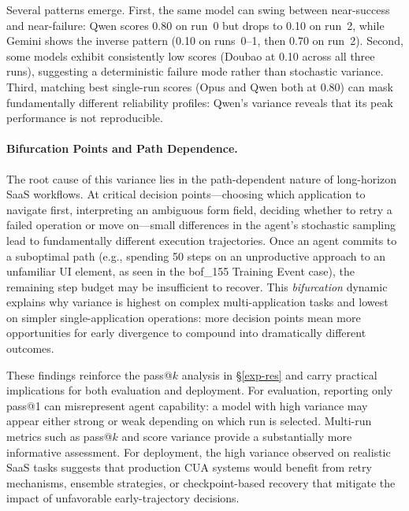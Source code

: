 Several patterns emerge. First, the same model can swing between near-success and near-failure: Qwen scores 0.80 on run~0 but drops to 0.10 on run~2, while Gemini shows the inverse pattern (0.10 on runs~0--1, then 0.70 on run~2). Second, some models exhibit consistently low scores (Doubao at 0.10 across all three runs), suggesting a deterministic failure mode rather than stochastic variance. Third, matching best single-run scores (Opus and Qwen both at 0.80) can mask fundamentally different reliability profiles: Qwen's variance reveals that its peak performance is not reproducible.

\paragraph{Bifurcation Points and Path Dependence.}
The root cause of this variance lies in the path-dependent nature of long-horizon SaaS workflows. At critical decision points---choosing which application to navigate first, interpreting an ambiguous form field, deciding whether to retry a failed operation or move on---small differences in the agent's stochastic sampling lead to fundamentally different execution trajectories. Once an agent commits to a suboptimal path (e.g., spending 50 steps on an unproductive approach to an unfamiliar UI element, as seen in the {\ttfamily bof\_155} Training Event case), the remaining step budget may be insufficient to recover. This \emph{bifurcation} dynamic explains why variance is highest on complex multi-application tasks and lowest on simpler single-application operations: more decision points mean more opportunities for early divergence to compound into dramatically different outcomes.

These findings reinforce the pass@$k$ analysis in \S\ref{exp-res} and carry practical implications for both evaluation and deployment. For evaluation, reporting only pass@1 can misrepresent agent capability: a model with high variance may appear either strong or weak depending on which run is selected. Multi-run metrics such as pass@$k$ and score variance provide a substantially more informative assessment. For deployment, the high variance observed on realistic SaaS tasks suggests that production CUA systems would benefit from retry mechanisms, ensemble strategies, or checkpoint-based recovery that mitigate the impact of unfavorable early-trajectory decisions.
